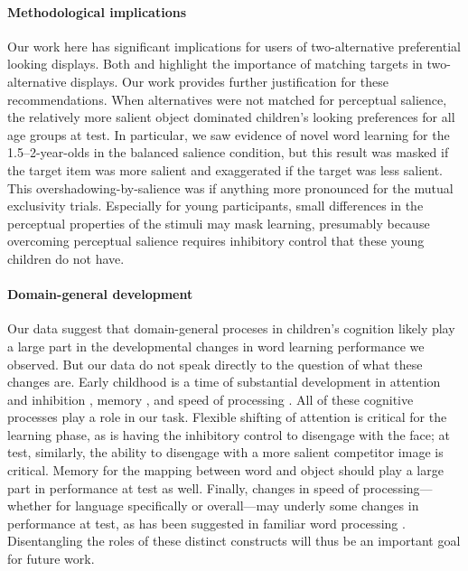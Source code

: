 \documentclass[man,floatsintext]{apa6}
\begin{document}
\paragraph{Methodological implications}

Our work here has significant implications for users of two-alternative preferential looking displays. Both  and  highlight the importance of matching targets in two-alternative displays. Our work provides further justification for these recommendations. When alternatives were not matched for perceptual salience, the relatively more salient object dominated children's looking preferences for all age groups at test. In particular, we saw evidence of novel word learning for the 1.5--2-year-olds in the balanced salience condition, but this result was masked if the target item was more salient and exaggerated if the target was less salient. This overshadowing-by-salience was if anything more pronounced for the mutual exclusivity trials.  Especially for young participants, small differences in the perceptual properties of the stimuli may mask learning, presumably because overcoming perceptual salience requires inhibitory control that these young children do not have. 

\paragraph{Domain-general development}

Our data suggest that domain-general proceses in children's cognition likely play a large part in the developmental changes in word learning performance we observed. But our data do not speak directly to the question of what these changes are. Early childhood is a time of substantial development in attention and inhibition \cite{smith1999b,diamond1989}, memory \cite{cowan1997}, and speed of processing \cite{kail1991,dougherty1997}. All of these cognitive processes play a role in our task. Flexible shifting of attention is critical for the learning phase, as is having the inhibitory control to disengage with the face; at test, similarly, the ability to disengage with a more salient competitor image is critical. Memory for the mapping between word and object should play a large part in performance at test as well. Finally, changes in speed of processing---whether for language specifically or overall---may underly some changes in performance at test, as has been suggested in familiar word processing \cite{fernald1998,fernald2006}. Disentangling the roles of these distinct constructs will thus be an important goal for future work. 
\end{document}

